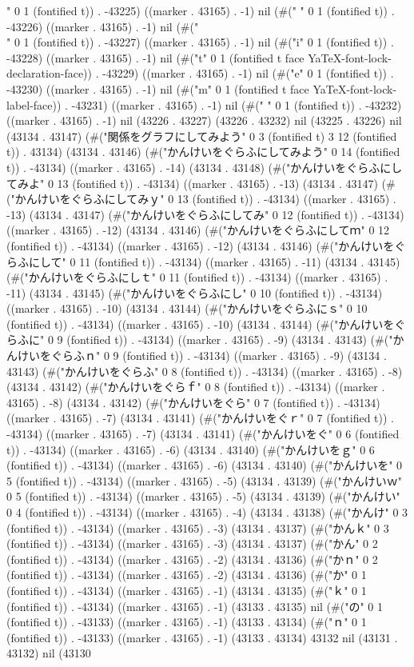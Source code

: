 " 0 1 (fontified t)) . -43225) ((marker . 43165) . -1) nil (#(" " 0 1 (fontified t)) . -43226) ((marker . 43165) . -1) nil (#("\\" 0 1 (fontified t)) . -43227) ((marker . 43165) . -1) nil (#("i" 0 1 (fontified t)) . -43228) ((marker . 43165) . -1) nil (#("t" 0 1 (fontified t face YaTeX-font-lock-declaration-face)) . -43229) ((marker . 43165) . -1) nil (#("e" 0 1 (fontified t)) . -43230) ((marker . 43165) . -1) nil (#("m" 0 1 (fontified t face YaTeX-font-lock-label-face)) . -43231) ((marker . 43165) . -1) nil (#(" " 0 1 (fontified t)) . -43232) ((marker . 43165) . -1) nil (43226 . 43227) (43226 . 43232) nil (43225 . 43226) nil (43134 . 43147) (#("関係をグラフにしてみよう" 0 3 (fontified t) 3 12 (fontified t)) . 43134) (43134 . 43146) (#("かんけいをぐらふにしてみよう" 0 14 (fontified t)) . -43134) ((marker . 43165) . -14) (43134 . 43148) (#("かんけいをぐらふにしてみよ" 0 13 (fontified t)) . -43134) ((marker . 43165) . -13) (43134 . 43147) (#("かんけいをぐらふにしてみｙ" 0 13 (fontified t)) . -43134) ((marker . 43165) . -13) (43134 . 43147) (#("かんけいをぐらふにしてみ" 0 12 (fontified t)) . -43134) ((marker . 43165) . -12) (43134 . 43146) (#("かんけいをぐらふにしてｍ" 0 12 (fontified t)) . -43134) ((marker . 43165) . -12) (43134 . 43146) (#("かんけいをぐらふにして" 0 11 (fontified t)) . -43134) ((marker . 43165) . -11) (43134 . 43145) (#("かんけいをぐらふにしｔ" 0 11 (fontified t)) . -43134) ((marker . 43165) . -11) (43134 . 43145) (#("かんけいをぐらふにし" 0 10 (fontified t)) . -43134) ((marker . 43165) . -10) (43134 . 43144) (#("かんけいをぐらふにｓ" 0 10 (fontified t)) . -43134) ((marker . 43165) . -10) (43134 . 43144) (#("かんけいをぐらふに" 0 9 (fontified t)) . -43134) ((marker . 43165) . -9) (43134 . 43143) (#("かんけいをぐらふｎ" 0 9 (fontified t)) . -43134) ((marker . 43165) . -9) (43134 . 43143) (#("かんけいをぐらふ" 0 8 (fontified t)) . -43134) ((marker . 43165) . -8) (43134 . 43142) (#("かんけいをぐらｆ" 0 8 (fontified t)) . -43134) ((marker . 43165) . -8) (43134 . 43142) (#("かんけいをぐら" 0 7 (fontified t)) . -43134) ((marker . 43165) . -7) (43134 . 43141) (#("かんけいをぐｒ" 0 7 (fontified t)) . -43134) ((marker . 43165) . -7) (43134 . 43141) (#("かんけいをぐ" 0 6 (fontified t)) . -43134) ((marker . 43165) . -6) (43134 . 43140) (#("かんけいをｇ" 0 6 (fontified t)) . -43134) ((marker . 43165) . -6) (43134 . 43140) (#("かんけいを" 0 5 (fontified t)) . -43134) ((marker . 43165) . -5) (43134 . 43139) (#("かんけいｗ" 0 5 (fontified t)) . -43134) ((marker . 43165) . -5) (43134 . 43139) (#("かんけい" 0 4 (fontified t)) . -43134) ((marker . 43165) . -4) (43134 . 43138) (#("かんけ" 0 3 (fontified t)) . -43134) ((marker . 43165) . -3) (43134 . 43137) (#("かんｋ" 0 3 (fontified t)) . -43134) ((marker . 43165) . -3) (43134 . 43137) (#("かん" 0 2 (fontified t)) . -43134) ((marker . 43165) . -2) (43134 . 43136) (#("かｎ" 0 2 (fontified t)) . -43134) ((marker . 43165) . -2) (43134 . 43136) (#("か" 0 1 (fontified t)) . -43134) ((marker . 43165) . -1) (43134 . 43135) (#("ｋ" 0 1 (fontified t)) . -43134) ((marker . 43165) . -1) (43133 . 43135) nil (#("の" 0 1 (fontified t)) . -43133) ((marker . 43165) . -1) (43133 . 43134) (#("ｎ" 0 1 (fontified t)) . -43133) ((marker . 43165) . -1) (43133 . 43134) 43132 nil (43131 . 43132) nil (43130 